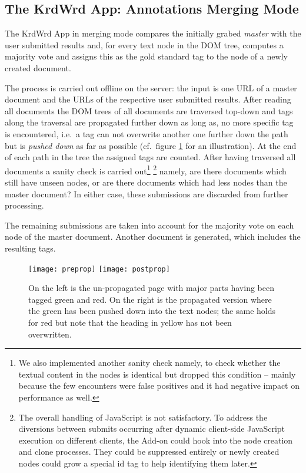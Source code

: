 \begin{longversion}
\subsection{The KrdWrd App: Annotations Merging Mode}

The KrdWrd App in merging mode compares the initially grabed \emph{master} with the user submitted results and, for every text node in the DOM tree, computes a majority vote and assigns this as the gold standard tag to the node of a newly created document. 

The process is carried out offline on the server:
the input is one URL of a master document and the URLs of the respective user submitted results.
After reading all documents the DOM trees of all documents are traversed top-down and tags along the traversal are propagated further down as long as, 
no more specific tag is encountered,
i.e.~a tag can not overwrite another one further down the path but is \emph{pushed down} as far as possible (cf.~figure \ref{fig:propagation} for an illustration).
At the end of each path in the tree the assigned tags are counted.
After having traversed all documents a sanity check is carried out\footnote{
We also implemented another sanity check namely, to check whether the textual content in the nodes is identical but dropped this condition -- mainly because the few encounters were false positives and it had negative impact on performance as well.
} \footnote{
The overall handling of JavaScript is not satisfactory.
To address the diversions between submits occurring after dynamic client-side JavaScript execution on different clients, the Add-on could hook into the node creation and clone processes.
They could be suppressed entirely or newly created nodes could grow a special id tag to help identifying them later.
} namely, are there documents which still have unseen nodes, or are there documents which had less nodes than the master document? 
In either case, these submissions are discarded from further processing.

The remaining submissions are taken into account for the majority vote on each node of the master document.
Another document is generated, which includes the resulting tags.

\begin{figure}[htb]
    \centering
    \begin{minipage}[c]{.9\textwidth}
        \texttt{[image: preprop]}
        \hfill
        \texttt{[image: postprop]}
    \end{minipage}
    \caption{On the left is the un-propagated page with major parts having been tagged green and red. On the right is the propagated version where the green has been pushed down into the text nodes; the same holds for red but note that the heading in yellow has not been overwritten.}
    \label{fig:propagation}
\end{figure}



\end{longversion}

